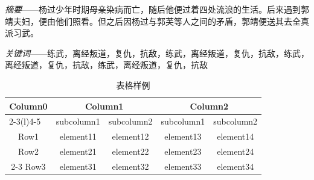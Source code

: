 \documentclass[doctor, vlined, ]{DissertUESTC}
\begin{document}


	\textit{摘要}——杨过少年时期母亲染病而亡，随后他便过着四处流浪的生活。后来遇到郭靖夫妇，便由他们照看。但之后因杨过与郭芙等人之间的矛盾，郭靖便送其去全真派习武。

	\textit{关键词}——练武，离经叛道，复仇，抗敌，练武，离经叛道，复仇，抗敌，练武，离经叛道，复仇，抗敌，练武，离经叛道，复仇，抗敌


	\begin{table}[htbp]
		\captionsetup{list=no}%
		\caption{表格样例}
		\begin{tabular}{ccccc}
			\toprule
			\multirow{2}{*}{Column0} &  \multicolumn{2}{c}{Column1\tnote{1}} & \multicolumn{2}{c}{Column2\tnote{2}} \\
			\cmidrule(lr){2-3}\cmidrule(l){4-5}
			~     & subcolumn1 & subcolumn2 & subcolumn1 & subcolumn2 \\
			\midrule
			Row1  & element11 & element12 &element13 & element14 \\
			Row2  & element21 & element22 &element23 & element24 \\
			\cmidrule{2-3}\cmidrule{4-5}
			Row3  & element31 & element32 &element33 & element34 \\
			\bottomrule
		\end{tabular}
	\end{table}




\end{document}
